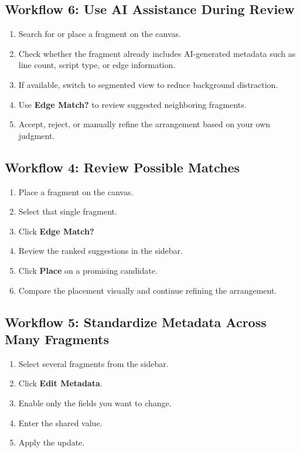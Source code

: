 \documentclass[12pt]{article}
\begin{document}
\subsection{Workflow 6: Use AI Assistance During Review}
\begin{enumerate}
  \item Search for or place a fragment on the canvas.
  \item Check whether the fragment already includes AI-generated metadata such as line count, script type, or edge information.
  \item If available, switch to segmented view to reduce background distraction.
  \item Use \textbf{Edge Match?} to review suggested neighboring fragments.
  \item Accept, reject, or manually refine the arrangement based on your own judgment.
\end{enumerate}

\subsection{Workflow 4: Review Possible Matches}
\begin{enumerate}
  \item Place a fragment on the canvas.
  \item Select that single fragment.
  \item Click \textbf{Edge Match?}
  \item Review the ranked suggestions in the sidebar.
  \item Click \textbf{Place} on a promising candidate.
  \item Compare the placement visually and continue refining the arrangement.
\end{enumerate}

\subsection{Workflow 5: Standardize Metadata Across Many Fragments}
\begin{enumerate}
  \item Select several fragments from the sidebar.
  \item Click \textbf{Edit Metadata}.
  \item Enable only the fields you want to change.
  \item Enter the shared value.
  \item Apply the update.
\end{enumerate}
\end{document}

